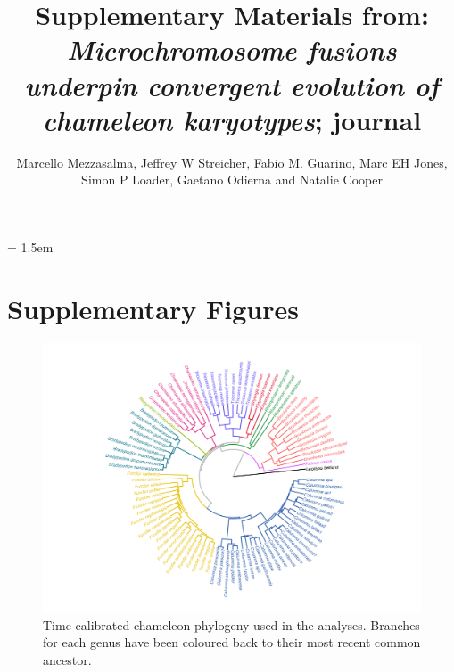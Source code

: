 \documentclass[a4paper, 12pt]{article}
\title{Supplementary Materials from: \textit{Microchromosome fusions underpin convergent evolution of chameleon karyotypes}; journal}
\author{Marcello Mezzasalma, Jeffrey W Streicher, Fabio M. Guarino, Marc EH Jones,\\ 
Simon P Loader, Gaetano Odierna and Natalie Cooper}
\date{}
\begin{document}
\maketitle

\tableofcontents

\parindent = 1.5em
\addtolength{\parskip}{.3em}


\newpage
\section{Supplementary Figures}

\begin{figure}[h]
 \centering
  \includegraphics[width = \linewidth]{figures/trees-genera-colour.png}
  \caption{Time calibrated chameleon phylogeny used in the analyses. 
  Branches for each genus have been coloured back to their most recent common ancestor.
}
  \label{fig-phylo}
\end{figure}
\end{document}
